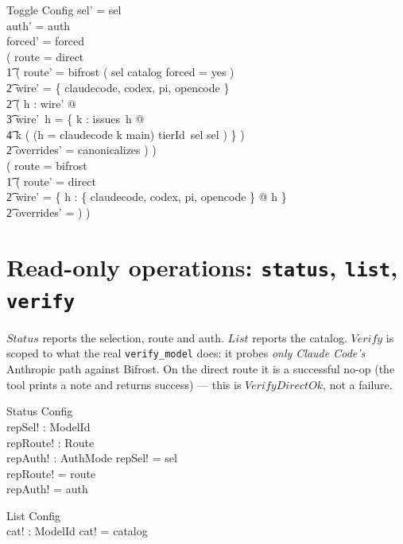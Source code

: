 \documentclass{article}
\begin{document}
\begin{schema}{Toggle}
  \Delta Config
\where
  sel' = sel \\
  auth' = auth \\
  forced' = forced \\
  ( route = direct \implies \\
  \t1 ( route' = bifrost \land ( sel \in catalog \lor forced = yes ) \land \\
  \t2   \dom wire' = \{ claudecode, codex, pi, opencode \} \land \\
  \t2   ( \forall h : \dom wire' @ \\
  \t3     wire'~h = \{ k : issues~h @ \\
  \t4       k \mapsto ( \IF (h = claudecode \land k \neq main) \THEN tierId~sel \ELSE sel ) \} ) \land \\
  \t2   overrides' = canonicalizes ) ) \\
  ( route = bifrost \implies \\
  \t1 ( route' = direct \land \\
  \t2   wire' = \{ h : \{ claudecode, codex, pi, opencode \} @ h \mapsto \emptyset \} \land \\
  \t2   overrides' = \emptyset ) )
\end{schema}

\section{Read-only operations: \texttt{status}, \texttt{list}, \texttt{verify}}

$Status$ reports the selection, route and auth. $List$ reports the catalog.
$Verify$ is scoped to what the real \texttt{verify\_model} does: it probes
\emph{only Claude Code's} Anthropic path against Bifrost. On the direct route it
is a successful no-op (the tool prints a note and returns success) --- this is
$VerifyDirectOk$, not a failure.

\begin{schema}{Status}
  \Xi Config \\
  repSel! : ModelId \\
  repRoute! : Route \\
  repAuth! : AuthMode
\where
  repSel! = sel \\
  repRoute! = route \\
  repAuth! = auth
\end{schema}

\begin{schema}{List}
  \Xi Config \\
  cat! : \power ModelId
\where
  cat! = catalog
\end{schema}
\end{document}
